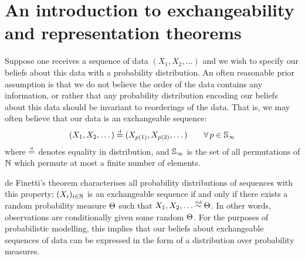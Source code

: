 
\section{An introduction to exchangeability and representation theorems}

Suppose one receives a sequence of data $(X_1, X_2, \dots)$ and we wish to specify our beliefs about this data with a probability distribution.
An often reasonable prior assumption is that we do not believe the order of the data contains any information, or rather that any probability distribution encoding our beliefs about this data should be invariant to reorderings of the data.
That is, we may often believe that our data is an exchangeable sequence:
\[
  \label{eq:intro:exch}
  (X_1, X_2, \dots) \stackrel{\mbox{\tiny d}}{=} (X_{p(1)}, X_{p(2)}, \dots) \qquad \forall\, p\in\mathbb{S}_{\infty}
\]
where $\stackrel{\mbox{\tiny d}}{=}$ denotes equality in distribution, and $\mathbb{S}_{\infty}$ is the set of all permutations of $\mathbb{N}$ which permute at most a finite number of elements.

de Finetti's theorem \citep[e.g.][]{Kallenberg2005-ec} characterises all probability distributions of sequences with this property;  $(X_i)_{i\in\mathbb{N}}$ is an exchangeable sequence if and only if there exists a random probability measure $\Theta$ such that $X_1,X_2,\ldots\overset{\mbox{\tiny iid}}{\sim}\Theta$.
In other words, observations are conditionally \iid given some random $\Theta$.
For the purposes of probabilistic modelling, this implies that our beliefs about exchangeable sequences of data can be expressed in the form of a distribution over probability measures.

